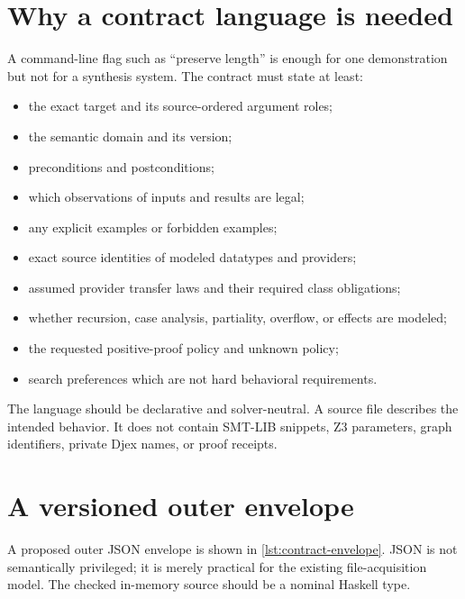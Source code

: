 \documentclass[11pt,oneside]{report}
\begin{document}
\section{Why a contract language is needed}

A command-line flag such as ``preserve length'' is enough for one demonstration but not for a synthesis system. The contract must state at least:

\begin{itemize}[leftmargin=2em]
\item the exact target and its source-ordered argument roles;
\item the semantic domain and its version;
\item preconditions and postconditions;
\item which observations of inputs and results are legal;
\item any explicit examples or forbidden examples;
\item exact source identities of modeled datatypes and providers;
\item assumed provider transfer laws and their required class obligations;
\item whether recursion, case analysis, partiality, overflow, or effects are modeled;
\item the requested positive-proof policy and unknown policy;
\item search preferences which are not hard behavioral requirements.
\end{itemize}

The language should be declarative and solver-neutral. A source file describes the intended behavior. It does not contain SMT-LIB snippets, Z3 parameters, graph identifiers, private Djex names, or proof receipts.

\section{A versioned outer envelope}
\label{sec:contract-envelope}

A proposed outer JSON envelope is shown in \cref{lst:contract-envelope}. JSON is not semantically privileged; it is merely practical for the existing file-acquisition model. The checked in-memory source should be a nominal Haskell type.
\end{document}
